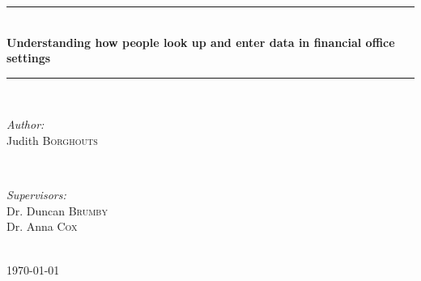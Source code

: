 \begin{titlepage}

\newcommand{\HRule}{\rule{\linewidth}{0.5mm}} %

\center %



\HRule \\[0.4cm]
{\Large \bfseries Understanding how people look up and enter data in financial office settings
}\\[0.4cm] %
\HRule \\[1.5cm]
 

\begin{minipage}{0.4\textwidth}
\begin{flushleft} \large
\emph{Author:}\\
Judith \textsc{Borghouts} %
\end{flushleft}
\end{minipage}
~
\begin{minipage}{0.4\textwidth}
\begin{flushright} \large
\emph{Supervisors:} \\
Dr. Duncan \textsc{Brumby} \\%
Dr. Anna \textsc{Cox}
\end{flushright}
\end{minipage}\\[4cm]



{\large \today}\\[3cm] %


\end{titlepage}
